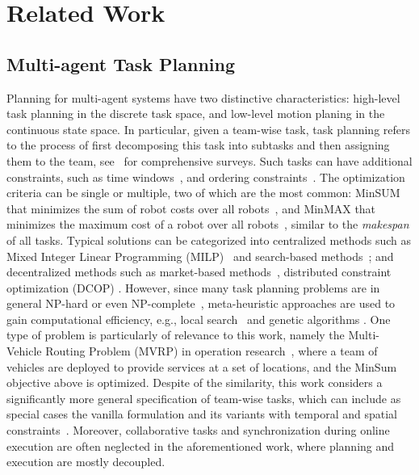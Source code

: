 \section{Related Work}\label{sec:related-work}




\subsection{Multi-agent Task Planning}\label{subsec:multi-tamp}
Planning for multi-agent systems have two distinctive characteristics:
high-level task planning in the discrete task space,
and low-level motion planing in the continuous state space.
In particular,
given a team-wise task, task planning refers to the process of first decomposing this task into subtasks
and then assigning them to the team, see~\citep{torreno2017cooperative,gini2017multi} for comprehensive surveys.
Such tasks can have additional constraints,
such as time windows~\citep{luo2015distributed},
and ordering constraints~\citep{nunes2015multi}.
The optimization criteria can be single or multiple,
two of which are the most common:
MinSUM that minimizes the sum of robot costs over all robots~\citep{gini2017multi, luo2015distributed},
and MinMAX that minimizes the maximum cost of a robot over all robots~\citep{nunes2015multi},
similar to the \emph{makespan} of all tasks.
Typical solutions can be categorized into centralized methods such as
Mixed Integer Linear Programming (MILP)~\citep{torreno2017cooperative} and search-based methods~\citep{toth2002overview};
and decentralized methods such as
market-based methods~\citep{luo2015distributed}, distributed constraint optimization (DCOP) \citep{nunes2015multi}.
However, since many task planning problems are in general NP-hard or even NP-complete~\citep{hochba1997approximation},
meta-heuristic approaches are used to gain computational efficiency,
e.g., local search~\citep{hoos2004stochastic} and genetic algorithms \citep{khamis2015multi}.
One type of problem is particularly of relevance to this work,
namely the Multi-Vehicle Routing Problem (MVRP) in operation research~\citep{gini2017multi},
where a team of vehicles are deployed to provide services at a set of locations,
and the MinSum objective above is optimized.
Despite of the similarity,
this work considers a significantly more general specification of team-wise tasks,
which can include as special cases the vanilla formulation and its variants with
temporal and spatial constraints~\citep{nunes2015multi}.
Moreover, collaborative tasks and synchronization during online execution are often neglected in the aforementioned work, where planning and execution are mostly decoupled.

